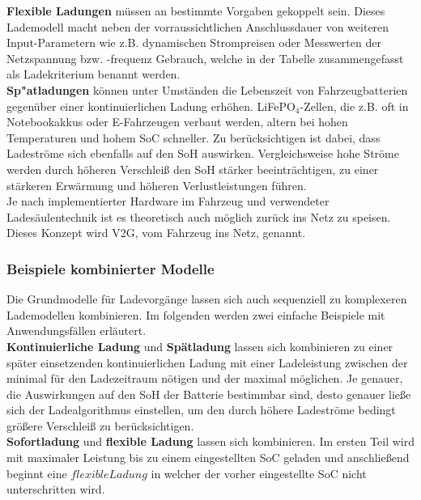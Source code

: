 				\textbf{Flexible Ladungen} müssen an bestimmte Vorgaben gekoppelt sein. Dieses Lademodell macht neben der vorraussichtlichen Anschlussdauer von weiteren Input-Parametern wie z.B. dynamischen Strompreisen oder Messwerten der Netzspannung bzw. -frequenz Gebrauch, welche in der Tabelle zusammengefasst als Ladekriterium benannt werden.\\ 
				
				\textbf{Sp"atladungen} können unter Umständen die Lebenszeit von Fahrzeugbatterien gegenüber einer kontinuierlichen Ladung erhöhen. LiFePO$_4$-Zellen, die z.B. oft in Notebookakkus oder E-Fahrzeugen verbaut werden, altern bei hohen Temperaturen und hohem SoC schneller. \cite[S.26]{FfE_Lademodelle_EAutos} Zu berücksichtigen ist dabei, dass Ladeströme sich ebenfalls auf den SoH auswirken. Vergleichsweise hohe Ströme werden durch höheren Verschleiß den SoH stärker beeinträchtigen, zu einer stärkeren Erwärmung und höheren Verlustleistungen führen.\\

				Je nach implementierter Hardware im Fahrzeug und verwendeter Ladesäulentechnik ist es theoretisch auch möglich zurück ins Netz zu speisen. Dieses Konzept wird \ac{V2G}, vom Fahrzeug ins Netz, genannt.\\
	
			\subsubsection{Beispiele kombinierter Modelle}
				Die Grundmodelle für Ladevorgänge lassen sich auch sequenziell zu komplexeren Lademodellen kombinieren. Im folgenden werden zwei einfache Beispiele mit Anwendungsfällen erläutert.\\
		
				\textbf{Kontinuierliche Ladung} und \textbf{Spätladung} lassen sich kombinieren zu einer später einsetzenden kontinuierlichen Ladung mit einer Ladeleistung zwischen der minimal für den Ladezeitraum nötigen und der maximal möglichen. Je genauer, die Auswirkungen auf den SoH der Batterie bestimmbar sind, desto genauer ließe sich der Ladealgorithmus einstellen, um den durch höhere Ladeströme bedingt größere Verschleiß zu berücksichtigen.\\
				
				\textbf{Sofortladung} und \textbf{flexible Ladung} lassen sich kombinieren. Im ersten Teil wird mit maximaler Leistung bis zu einem eingestellten SoC geladen und anschließend beginnt eine $flexible Ladung$ in welcher der vorher eingestellte SoC nicht unterschritten wird.  
		
